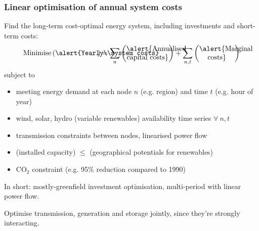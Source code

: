 \documentclass[10pt,aspectratio=169,dvipsnames]{beamer}
\let\olditem\item
\renewcommand{\item}{%
\olditem\vspace{5pt}}
\begin{document}
\begin{frame}[fragile]
  \frametitle{Linear optimisation of annual system costs}

Find the long-term cost-optimal energy system, including investments and short-term costs:
\begin{equation*}
  \textrm{Minimise} \left(\parbox{6em}{\centering\alert{Yearly\\system costs}}\right) = \sum_n \left(\parbox{6em}{\centering\alert{Annualised capital costs}}\right) + \sum_{n,t} \left(\parbox{5em}{\centering\alert{Marginal costs}}\right)
\end{equation*}
subject to
\begin{itemize}
\item meeting \alert{energy demand} at each node $n$ (e.g. region) and time $t$ (e.g. hour of year)
\item wind, solar, hydro (variable renewables) \alert{availability time series} $\forall\: n,t$
\item \alert{transmission constraints} between nodes, \alert{linearised power flow}
\item (installed capacity) $\leq$ (\alert{geographical potentials} for renewables)
\item \alert{CO${}_2$ constraint} (e.g. 95\% reduction compared to 1990)
\end{itemize}

In short: mostly-greenfield investment optimisation, multi-period with linear power flow.

Optimise transmission, generation and storage \alert{jointly}, since they're strongly interacting.
\end{frame}
\end{document}

